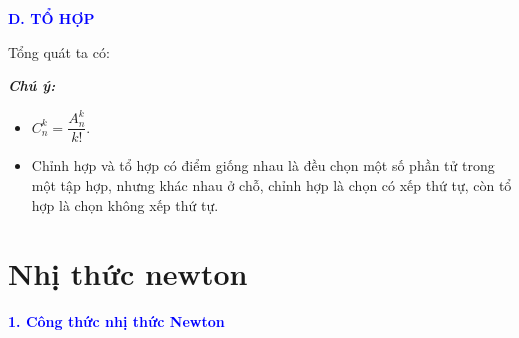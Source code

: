 \documentclass[12pt,a4paper]{extarticle}
\begin{document}
\vspace{0.2cm}

\vspace{0.5cm}
\noindent \textbf{\textcolor{blue}{\large D. TỔ HỢP}}

\noindent Tổng quát ta có:

\vspace{0.1cm}
\noindent{}

\vspace{0.2cm}
\noindent \textbf{\textit{Chú ý:}}
\begin{itemize}
    \item $C_n^k = \dfrac{A_n^k}{k!}$.
    \item Chỉnh hợp và tổ hợp có điểm giống nhau là đều chọn một số phần tử trong một tập hợp, nhưng khác nhau ở chỗ, chỉnh hợp là chọn có xếp thứ tự, còn tổ hợp là chọn không xếp thứ tự.
\end{itemize}
\section{Nhị thức newton}
\noindent \textbf{\textcolor{blue}{\large 1. Công thức nhị thức Newton}}
\end{document}

